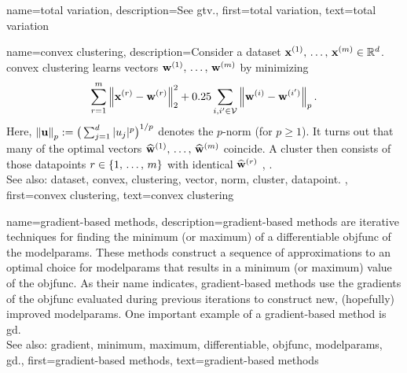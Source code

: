 {name={total variation}, 
	description={See \gls{gtv}.},
	first={total variation},
	text={total variation} 
}


 {name={convex clustering}, 
 	description={Consider a \gls{dataset} 
 		${\bf x}^{(1)}, \,\ldots, \,{\bf x}^{(m)} \in \mathbb{R}^{d}$. 
 		\Gls{convex} \gls{clustering} learns \glspl{vector} ${\bf w}^{(1)}, \,\ldots, \,{\bf w}^{(m)}$ by minimizing 
 		$$\sum_{r=1}^{m} \left\Vert {{\bf x}^{(r)} - {\bf w}^{(r)}} \right\Vert_{2}^2 + 
 		0.25 \sum_{i,i' \in \mathcal{V}} \left\Vert {{\bf w}^{(i)} - {\bf w}^{(i')}} \right\Vert_{p}.$$ 
		Here, $\left\Vert {{\bf u}} \right\Vert_{p} := \big( \sum_{j=1}^{d} |u_{j}|^{p} \big)^{1/p}$ 
		denotes the $p$-\gls{norm} (for $p\geq1$).  
		It turns out that many of the optimal \glspl{vector} $\widehat{{\bf w}}^{(1)}, \,\ldots, \,\widehat{{\bf w}}^{(m)}$ 
		coincide. A \gls{cluster} then consists of those \glspl{datapoint} $r \in \{1, \,\ldots, \,m\}$ 
		with identical $\widehat{{\bf w}}^{(r)}$ \cite{JMLR:v22:18-694}, \cite{Pelckmans2005}. 
			\\
		See also: \gls{dataset}, \gls{convex}, \gls{clustering}, \gls{vector}, \gls{norm}, \gls{cluster}, \gls{datapoint}. },
 	first={convex clustering},
	text={convex clustering} 
}


{name={gradient-based methods}, 
	description={\Gls{gradient}-based 
		methods are iterative techniques for finding the \gls{minimum} (or \gls{maximum}) 
		of a \gls{differentiable} \gls{objfunc} of the \gls{modelparams}. These 
		methods construct a sequence of approximations to an optimal choice for 
		\gls{modelparams} that results in a \gls{minimum} (or \gls{maximum}) value of the \gls{objfunc}. 
		As their name indicates, \gls{gradient}-based methods use the \glspl{gradient} of the \gls{objfunc} 
		evaluated during previous iterations to construct new, (hopefully) improved \gls{modelparams}. 
		One important example of a \gls{gradient}-based method is \gls{gd}.
				\\
		See also: \gls{gradient}, \gls{minimum}, \gls{maximum}, \gls{differentiable}, \gls{objfunc}, \gls{modelparams}, \gls{gd}.},
	first={gradient-based methods},
	text={gradient-based methods} 
}


